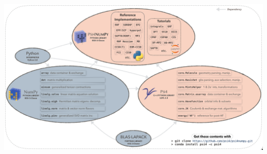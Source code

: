 \documentclass[xcolor=usenames,dvipsnames,svgnames]{beamer}
\begin{document}

\begin{frame}
  \centering
  \includegraphics[width=\linewidth,keepaspectratio]{../paper_05/fig1-oval-org.pdf}
\end{frame}
\end{document}
